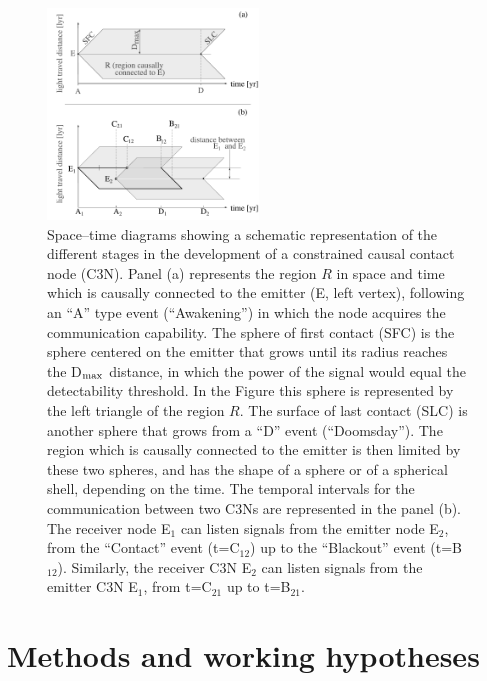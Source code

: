 \documentclass[crop]{CSLB}
\newcommand{\ceti}{C3N}
\newcommand{\cetis}{C3Ns}
\begin{document}
\begin{figure}[!t]
   \centering
   \includegraphics[width=0.5\textwidth]{F_scheme.pdf}
   \caption{
Space--time diagrams showing a schematic representation of the different stages
in the development of a constrained causal contact node (\ceti{}).
%
Panel (a) represents the region $R$ in space and time which is causally
connected to the emitter (E, left vertex), following an ``A'' type
event (``Awakening'') in which the node acquires the communication
capability.
%
The sphere of first contact (SFC) is the sphere centered on the emitter that
grows until its radius reaches the D$_{\rm max}$ distance, in which the
power of the signal would equal the detectability threshold.
%
In the Figure this sphere is represented by the left triangle of the region
$R$.
%
The surface of last contact (SLC) is another sphere that grows from a ``D''
event (``Doomsday'').
%
The region which is causally connected to the emitter is then limited by these
two spheres, and has the shape of a sphere or of a spherical shell,
depending on the time.
%
The temporal intervals for the communication between two \cetis{} are
represented in the panel (b).
%
The receiver node E$_1$ can listen signals from the emitter node E$_2$, from
the ``Contact'' event (t=C$_{12}$) up to the ``Blackout'' event
(t=B$_{12}$).
%
Similarly, the receiver \ceti{} E$_2$ can listen signals from the emitter
\ceti{} E$_1$, from t=C$_{21}$ up to t=B$_{21}$. 
%
} \label{F_scheme}
%
\end{figure}



\section{Methods and working hypotheses}\label{S_methods}
\end{document}
